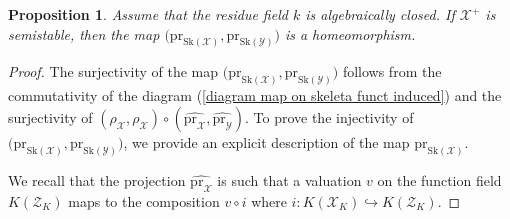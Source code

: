 \documentclass{amsart}%
\numberwithin{equation}{subsection}
\theoremstyle{plain2}
\newtheorem{prop}[equation]{Proposition}
\theoremstyle{definition2}
\theoremstyle{stepstyle}
\theoremstyle{point}
\theoremstyle{subpoint}
\newcommand{\cX}{\ensuremath{\mathscr{X}}}
\newcommand{\cY}{\ensuremath{\mathscr{Y}}}
\newcommand{\cZ}{\ensuremath{\mathscr{Z}}}
\renewcommand{\cZ}{\ensuremath{\mathscr{Z}}}
\renewcommand{\cY}{\ensuremath{\mathscr{Y}}}
\newcommand{\pr}{\mathrm{pr}}
\newcommand{\Sk}{\mathrm{Sk}}
\begin{document}
\begin{prop}  \label{prop semistability and skeleta}
Assume that the residue field $k$ is algebraically closed.  If $\cX^+$ is semistable, then the map $\big(\pr_{\Sk(\cX)}, \pr_{\Sk(\cY)}\big)$ is a homeomorphism.
\end{prop}
\begin{proof}
The surjectivity of the map $\big(\pr_{\Sk(\cX)}, \pr_{\Sk(\cY)}\big)$ follows from the commutativity of the diagram (\ref{diagram map on skeleta funct induced}) and the surjectivity of $(\rho_\cX, \rho_\cX) \circ (\widehat{\pr_{\cX}}, \widehat{\pr_{\cY}})$. To prove the injectivity of $\big(\pr_{\Sk(\cX)}, \pr_{\Sk(\cY)}\big)$, we provide an explicit description of the map $\pr_{\Sk(\cX)}$.

We recall that the projection $\widehat{\pr_{\cX}}$ is such that a valuation $v$ on the function field $K(\cZ_K)$ maps to the composition $v \circ i$ where $i:K(\cX_K) \hookrightarrow K(\cZ_K)$.


\end{proof}
\end{document}
